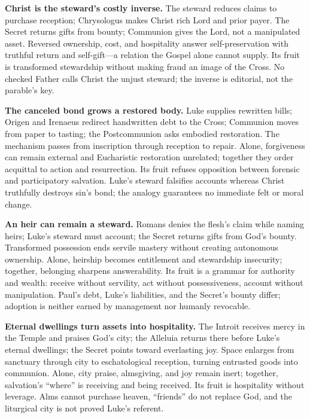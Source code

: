 \noindent\textbf{Christ is the steward's costly inverse.\enspace{}}
The steward reduces claims to purchase reception; Chrysologus makes Christ rich Lord and prior payer. The Secret returns gifts from bounty; Communion gives the Lord, not a manipulated asset. Reversed ownership, cost, and hospitality answer self-preservation with truthful return and self-gift---a relation the Gospel alone cannot supply. Its fruit is transformed stewardship without making fraud an image of the Cross. No checked Father calls Christ the unjust steward; the inverse is editorial, not the parable's key.

\noindent\textbf{The canceled bond grows a restored body.\enspace{}}
Luke supplies rewritten bills; Origen and Irenaeus redirect handwritten debt to the Cross; Communion moves from paper to tasting; the Postcommunion asks embodied restoration. The mechanism passes from inscription through reception to repair. Alone, forgiveness can remain external and Eucharistic restoration unrelated; together they order acquittal to action and resurrection. Its fruit refuses opposition between forensic and participatory salvation. Luke's steward falsifies accounts whereas Christ truthfully destroys sin's bond; the analogy guarantees no immediate felt or moral change.

\noindent\textbf{An heir can remain a steward.\enspace{}}
Romans denies the flesh's claim while naming heirs; Luke's steward must account; the Secret returns gifts from God's bounty. Transformed possession ends servile mastery without creating autonomous ownership. Alone, heirship becomes entitlement and stewardship insecurity; together, belonging sharpens answerability. Its fruit is a grammar for authority and wealth: receive without servility, act without possessiveness, account without manipulation. Paul's debt, Luke's liabilities, and the Secret's bounty differ; adoption is neither earned by management nor humanly revocable.

\noindent\textbf{Eternal dwellings turn assets into hospitality.\enspace{}}
The Introit receives mercy in the Temple and praises God's city; the Alleluia returns there before Luke's eternal dwellings; the Secret points toward everlasting joy. Space enlarges from sanctuary through city to eschatological reception, turning entrusted goods into communion. Alone, city praise, almsgiving, and joy remain inert; together, salvation's ``where'' is receiving and being received. Its fruit is hospitality without leverage. Alms cannot purchase heaven, ``friends'' do not replace God, and the liturgical city is not proved Luke's referent.
